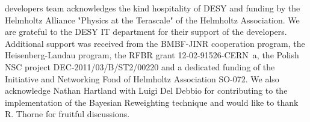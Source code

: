 %
%

\begin{acknowledgements}
\fitter developers team acknowledges the kind hospitality of DESY 
and funding by the Helmholtz Alliance "Physics at the Terascale" of the Helmholtz Association.
We are grateful to the DESY IT department for their support of the \fitter  developers.
Additional support was received from the BMBF-JINR cooperation program,
the Heisenberg-Landau program, the RFBR grant 12-02-91526-CERN~a, 
the Polish NSC project DEC-2011/03/B/ST2/00220 and 
a dedicated funding of the Initiative and Networking Fond of Helmholtz Association SO-072. 
We also acknowledge Nathan Hartland with Luigi Del Debbio for contributing to the 
implementation of the Bayesian Reweighting technique and
would like to thank R. Thorne for fruitful discussions.
\end{acknowledgements}



